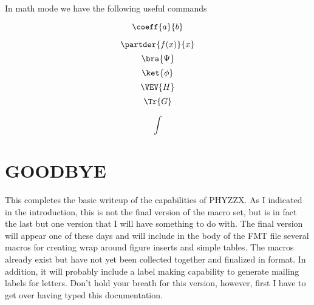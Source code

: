 \pointbegin
{}
\point
{}
\point
{}
\point
{}
 
In math mode we have the following useful commands
 
\point
{}
$$ \coeff{a}{b} $$
 
\endpage
 
 
\point
{}
$$ \partder{f(x)}{x} $$
\point
{}
$$ \bra{\Psi} $$
\point
{}
$$ \ket{\phi} $$
\point
{}
$$ \VEV{H} $$
\point
{}
$$ \Tr{G} $$
 
\endpage
 
\point
{}
$$ \int $$
\point
{}
\point
{}
\point
{}
 
\chapter{GOODBYE}
 
This completes the basic writeup of the capabilities of PHYZZX.
As I indicated in the introduction, this is not the final version of
the macro set, but is in fact the last but one version that I
will have something to do with.
The final version will appear one of these days and will include
in the body of the FMT file several macros for creating wrap around
figure inserts and simple tables.
The macros already exist but
have not yet been collected together and finalized in format.
In addition, it will probably include a label making capability
to generate mailing labels for letters.
Don't hold your breath for this version, however, first I have
to get over having typed this documentation.
 
